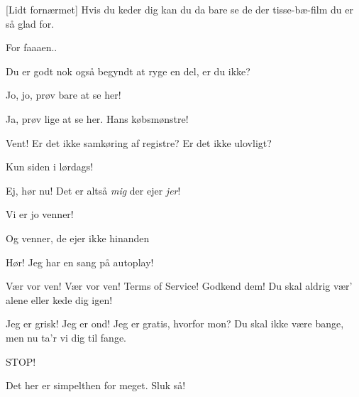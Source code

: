 \documentclass[a4paper,11pt]{article}
\begin{document}
\begin{sketch}
  [Lidt fornærmet] Hvis du keder dig kan du da bare se de der
  tisse-bæ-film du er så glad for.




   For faaaen.. 

   Du er godt nok også begyndt at ryge en del, er du ikke?

   Jo, jo, prøv bare at se her! 

   Ja, prøv lige at se her. Hans købsmønstre! 



   Vent! Er det ikke samkøring af registre? Er det ikke ulovligt?

   Kun siden i lørdags!

   Ej, hør nu! Det er altså \emph{mig} der ejer \emph{jer}!


   Vi er jo venner!

   Og venner, de ejer ikke hinanden

   Hør! Jeg har en sang på autoplay!


   Vær vor ven! Vær vor ven!
   Terms of Service!
   Godkend dem! 
   Du skal aldrig vær' alene eller kede dig igen!
  
   Jeg er grisk!
   Jeg er ond!
   Jeg er gratis, hvorfor mon?
   Du skal ikke være bange, men nu ta'r vi dig til fange. 
  
   STOP!

   Det her er simpelthen for meget. Sluk så!


\end{sketch}
\end{document}
